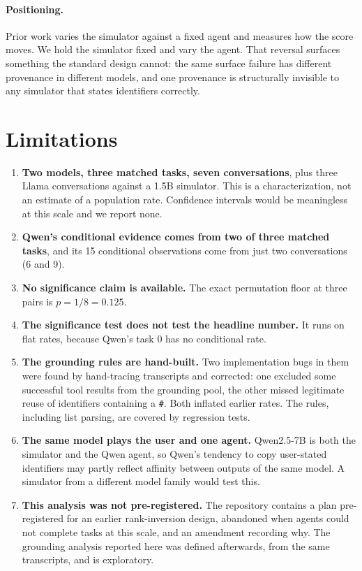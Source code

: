 \documentclass{article}
\begin{document}
\paragraph{Positioning.} Prior work varies the simulator against a fixed agent and measures how the score moves. We hold the simulator fixed and vary the agent. That reversal surfaces something the standard design cannot: the same surface failure has different provenance in different models, and one provenance is structurally invisible to any simulator that states identifiers correctly.

\section{Limitations}

\begin{enumerate}
\item \textbf{Two models, three matched tasks, seven conversations}, plus three Llama conversations against a 1.5B simulator. This is a characterization, not an estimate of a population rate. Confidence intervals would be meaningless at this scale and we report none.
\item \textbf{Qwen's conditional evidence comes from two of three matched tasks}, and its 15 conditional observations come from just two conversations (6 and 9).
\item \textbf{No significance claim is available.} The exact permutation floor at three pairs is $p = 1/8 = 0.125$.
\item \textbf{The significance test does not test the headline number.} It runs on flat rates, because Qwen's task 0 has no conditional rate.
\item \textbf{The grounding rules are hand-built.} Two implementation bugs in them were found by hand-tracing transcripts and corrected: one excluded some successful tool results from the grounding pool, the other missed legitimate reuse of identifiers containing a \texttt{\#}. Both inflated earlier rates. The rules, including list parsing, are covered by regression tests.
\item \textbf{The same model plays the user and one agent.} Qwen2.5-7B is both the simulator and the Qwen agent, so Qwen's tendency to copy user-stated identifiers may partly reflect affinity between outputs of the same model. A simulator from a different model family would test this.
\item \textbf{This analysis was not pre-registered.} The repository contains a plan pre-registered for an earlier rank-inversion design, abandoned when agents could not complete tasks at this scale, and an amendment recording why. The grounding analysis reported here was defined afterwards, from the same transcripts, and is exploratory.

\end{enumerate}
\end{document}

